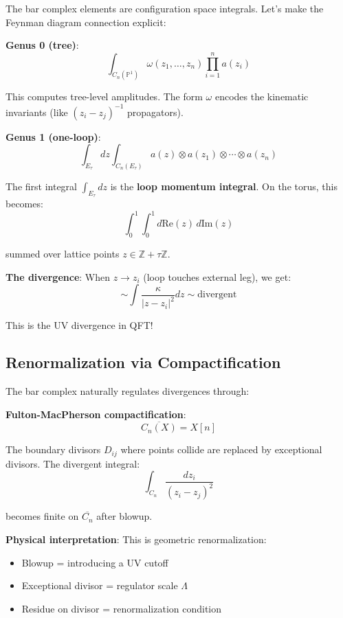 The bar complex elements are configuration space integrals. Let's make the Feynman diagram connection explicit:

\textbf{Genus 0 (tree)}:
\begin{equation}
\int_{C_n(\mathbb{P}^1)} \omega(z_1, \ldots, z_n) \prod_{i=1}^n a(z_i)
\end{equation}

This computes tree-level amplitudes. The form $\omega$ encodes the kinematic invariants (like $(z_i - z_j)^{-1}$ propagators).

\textbf{Genus 1 (one-loop)}:
\begin{equation}
\int_{E_\tau} dz \int_{C_n(E_\tau)} a(z) \otimes a(z_1) \otimes \cdots \otimes a(z_n)
\end{equation}

The first integral $\int_{E_\tau} dz$ is the \textbf{loop momentum integral}. On the torus, this becomes:
\begin{equation}
\int_0^1 \int_0^1 d\text{Re}(z) \, d\text{Im}(z)
\end{equation}

summed over lattice points $z \in \mathbb{Z} + \tau\mathbb{Z}$.

\textbf{The divergence}: When $z \to z_i$ (loop touches external leg), we get:
\begin{equation}
\sim \int \frac{\kappa}{|z - z_i|^2} dz \sim \text{divergent}
\end{equation}

This is the UV divergence in QFT!

\subsection{Renormalization via Compactification}

The bar complex naturally regulates divergences through:

\textbf{Fulton-MacPherson compactification}: 
\begin{equation}
\overline{C_n(X)} = X[n]
\end{equation}

The boundary divisors $D_{ij}$ where points collide are replaced by exceptional divisors. The divergent integral:
\begin{equation}
\int_{C_n} \frac{dz_i}{(z_i - z_j)^2}
\end{equation}

becomes finite on $\overline{C_n}$ after blowup.

\textbf{Physical interpretation}: This is geometric renormalization:
\begin{itemize}
\item Blowup = introducing a UV cutoff
\item Exceptional divisor = regulator scale $\Lambda$
\item Residue on divisor = renormalization condition
\end{itemize}

